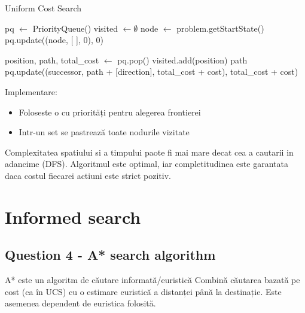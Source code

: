\begin{algorithm}
\caption{Uniform Cost Search}
\begin{algorithmic}[1]
    \State pq $\gets$ PriorityQueue()
    \State visited $\gets \emptyset$
    \State node $\gets$ problem.getStartState()
    \State pq.update((node, [ ], 0), 0)
    
        \State position, path, total\_cost $\gets$ pq.pop()
            \State visited.add(position)
                \Return path
            \EndIf
                    \State pq.update((successor, path + [direction], total\_cost + cost), total\_cost + cost)
                \EndIf
            \EndFor
        \EndIf
    \EndWhile \\
    \Return [ ]
\EndFunction
\end{algorithmic}
\end{algorithm}

\par Implementare:
\begin {itemize}
	\item Foloseste o cu priorități pentru alegerea frontierei
	\item Intr-un set se pastrează toate nodurile vizitate
\end {itemize}

\par Complexitatea spatiului si a timpului paote fi mai mare decat cea a cautarii in adancime (DFS). Algoritmul este optimal, iar completitudinea este garantata daca costul fiecarei actiuni este strict pozitiv.


\pagebreak

\section{Informed search}
\subsection{Question 4 - A* search  algorithm}

\par A* este un algoritm de căutare informată/euristică
Combină căutarea bazată pe cost (ca în UCS) cu o estimare euristică a distanței până la destinație. Este asemenea dependent de euristica folosită.

